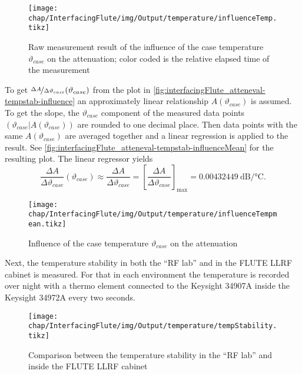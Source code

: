 \begin{figure}[tb]
	\centering
	\texttt{[image: chap/InterfacingFlute/img/Output/temperature/influenceTemp.tikz]}
	\caption{Raw measurement result of the influence of the case temperature $\vartheta_{case}$ on the attenuation; color coded is the relative elapsed time of the measurement}
	\label{fig:interfacingFlute_atteneval-tempstab-influence}
\end{figure}

To get $\nicefrac{\Delta A}{\Delta \vartheta_{case}} (\vartheta_{case})$ from the plot in \autoref{fig:interfacingFlute_atteneval-tempstab-influence} an approximately linear relationship $A(\vartheta_{case})$ is assumed. To get the slope, the $\vartheta_{case}$ component of the measured data points $(\vartheta_{case}|A(\vartheta_{case}))$ are rounded to one decimal place. Then data points with the same $A(\vartheta_{case})$ are averaged together and a linear regression is applied to the result. See \autoref{fig:interfacingFlute_atteneval-tempstab-influenceMean} for the resulting plot. The linear regressor yields
\begin{equation}
\frac{\Delta A}{\Delta \vartheta_{case}} (\vartheta_{case})
\approx \frac{\Delta A}{\Delta \vartheta_{case}}
= \left[\frac{\Delta A}{\Delta \vartheta_{case}}\right]_\text{max}
= \SI{0.00432449}{\dB\per\celsius}.
\end{equation}

\begin{figure}[tb]
	\centering
	\texttt{[image: chap/InterfacingFlute/img/Output/temperature/influenceTempmean.tikz]}
	\caption{Influence of the case temperature $\vartheta_{case}$ on the attenuation}
	\label{fig:interfacingFlute_atteneval-tempstab-influenceMean}
\end{figure}

Next, the temperature stability in both the ``RF lab'' and in the FLUTE LLRF cabinet is measured. For that in each environment the temperature is recorded over night with a thermo element connected to the Keysight 34907A inside the Keysight 34972A every two seconds.

\begin{figure}[tb]
	\centering
	\texttt{[image: chap/InterfacingFlute/img/Output/temperature/tempStability.tikz]}
	\caption{Comparison between the temperature stability in the ``RF lab'' and inside the FLUTE LLRF cabinet}
	\label{fig:interfacingFlute_atteneval-tempstab-time}
\end{figure}

